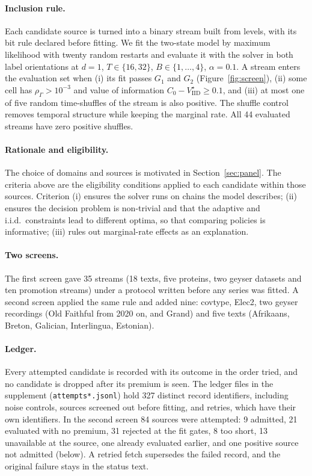 \documentclass{article}
\theoremstyle{plain}
\theoremstyle{definition}
\theoremstyle{remark}
\newcommand{\Vi}{V^\star_{\mathrm{IID}}}
\newcommand{\rhoG}{\rho_\Gamma}
\begin{document}
\paragraph{Inclusion rule.} Each candidate source is turned into a binary stream built from levels, with its bit rule declared before fitting. We fit the two-state model by maximum likelihood with twenty random restarts and evaluate it with the solver in both label orientations at $d=1$, $T\in\{16,32\}$, $B\in\{1,\dots,4\}$, $\alpha=0.1$. A stream enters the evaluation set when (i) its fit passes $G_1$ and $G_2$ (Figure~\ref{fig:screen}), (ii) some cell has $\rhoG>10^{-3}$ and value of information $C_0-\Vi\ge0.1$, and (iii) at most one of five random time-shuffles of the stream is also positive. The shuffle control removes temporal structure while keeping the marginal rate. All 44 evaluated streams have zero positive shuffles.

\paragraph{Rationale and eligibility.} The choice of domains and sources is motivated in Section~\ref{sec:panel}. The criteria above are the eligibility conditions applied to each candidate within those sources. Criterion (i) ensures the solver runs on chains the model describes; (ii) ensures the decision problem is non-trivial and that the adaptive and i.i.d.\ constraints lead to different optima, so that comparing policies is informative; (iii) rules out marginal-rate effects as an explanation.

\paragraph{Two screens.} The first screen gave 35 streams (18 texts, five proteins, two geyser datasets and ten promotion streams) under a protocol written before any series was fitted. A second screen applied the same rule and added nine: covtype, Elec2, two geyser recordings (Old Faithful from 2020 on, and Grand) and five texts (Afrikaans, Breton, Galician, Interlingua, Estonian).

\paragraph{Ledger.} Every attempted candidate is recorded with its outcome in the order tried, and no candidate is dropped after its premium is seen. The ledger files in the supplement (\texttt{attempts*.jsonl}) hold 327 distinct record identifiers, including noise controls, sources screened out before fitting, and retries, which have their own identifiers. In the second screen 84 sources were attempted: 9 admitted, 21 evaluated with no premium, 31 rejected at the fit gates, 8 too short, 13 unavailable at the source, one already evaluated earlier, and one positive source not admitted (below). A retried fetch supersedes the failed record, and the original failure stays in the status text.
\end{document}
